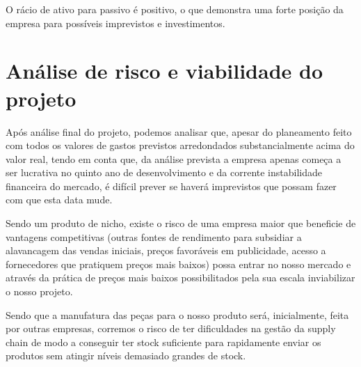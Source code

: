 \documentclass[a4paper]{article}
\begin{document}
O rácio de ativo para passivo é positivo, o que demonstra uma forte posição da empresa para possíveis imprevistos e investimentos.

\part{Análise de risco e viabilidade do projeto}
Após análise final do projeto, podemos analisar que, apesar do planeamento feito com todos os valores de gastos previstos arredondados substancialmente acima do valor real, tendo em conta que, da análise prevista a empresa apenas começa a ser lucrativa no quinto ano de desenvolvimento e da corrente instabilidade financeira do mercado, é difícil prever se haverá imprevistos que possam fazer com que esta data mude.

Sendo um produto de nicho, existe o risco de uma empresa maior que beneficie de vantagens competitivas (outras fontes de rendimento para subsidiar a alavancagem das vendas iniciais, preços favoráveis em publicidade, acesso a fornecedores que pratiquem preços mais baixos) possa entrar no nosso mercado e através da prática de preços mais baixos possibilitados pela sua escala inviabilizar o nosso projeto. 

Sendo que a manufatura das peças para o nosso produto será, inicialmente, feita por outras empresas, corremos o risco de ter dificuldades na gestão da supply chain de modo a conseguir ter stock suficiente para rapidamente enviar os produtos sem atingir níveis demasiado grandes de stock.
\end{document}
